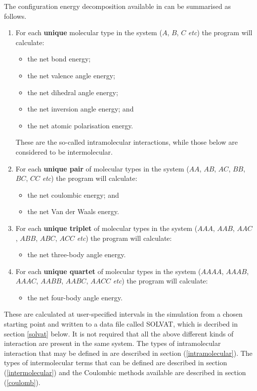 The configuration energy decomposition available in \D{} can be summarised as
follows.
\begin{enumerate}
\item For each {\bf unique} molecular type in the system ($A$, $B$, $C$ {\em
    etc}) the program will calculate:
\begin{itemize}
\item the net bond energy;
\item the net valence angle energy;
\item the net dihedral angle energy;
\item the net inversion angle energy; and
\item the net atomic polarisation energy.
\end{itemize}
These are the so-called intramolecular interactions, while those below are
considered to be intermolecular.
\item For each {\bf unique pair} of molecular types in the system ($AA$, $AB$,
  $AC$, $BB$, $BC$, $CC$ {\em etc}) the program will calculate:
\begin{itemize}
\item the net coulombic energy; and
\item the net Van der Waals energy.
\end{itemize}
\item For each {\bf unique triplet} of molecular types in the system ($AAA$,
  $AAB$, $AAC$, $ABB$, $ABC$, $ACC$ {\em etc}) the program will calculate:
\begin{itemize}
\item the net three-body angle energy.
\end{itemize}
\item For each {\bf unique quartet} of molecular types in the system ($AAAA$,
  $AAAB$, $AAAC$, $AABB$, $AABC$, $AACC$ {\em etc}) the program will calculate:
\begin{itemize}
\item the net four-body angle energy.
\end{itemize}
\end{enumerate}
These are calculated at user-specified intervals in the simulation from a
chosen starting point and written to a data file called SOLVAT, which is
decribed in section \ref{solvat} below.  It is not required that all the above
different kinds of interaction are present in the same system.  The types of
intramolecular interaction that may be defined in \D{} are described in section
(\ref{intramolecular}). The types of intermolecular terms that can be defined
are described in section (\ref{intermolecular}) and the Coulombic methods
available are described in section (\ref{coulomb}).

